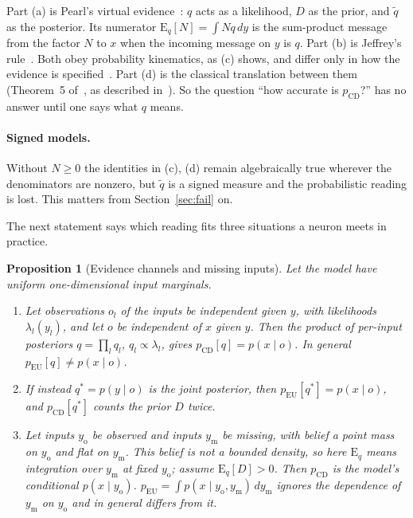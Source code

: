 \documentclass[10pt,a4paper]{article}
\newcommand{\pcd}{p_{\mathrm{CD}}}
\newcommand{\peu}{p_{\mathrm{EU}}}
\newcommand{\Eq}{\mathrm{E}_q}
\newcommand{\yo}{y_{\mathrm{o}}}
\newcommand{\ym}{y_{\mathrm{m}}}
\theoremstyle{upright}
\newtheorem{proposition}[theorem]{Proposition}
\begin{document}
Part (a) is Pearl's virtual evidence~\citep{pearl1988probabilistic}: $q$ acts as a likelihood, $D$ as the prior, and $\tilde q$ as the posterior. Its numerator $\Eq[N]=\int N q\,dy$ is the sum-product message~\citep{kschischang2001factor} from the factor $N$ to $x$ when the incoming message on $y$ is $q$. Part (b) is Jeffrey's rule~\citep{jeffrey1965logic,diaconis1982updating}. Both obey probability kinematics, as (c) shows, and differ only in how the evidence is specified~\citep{chan2003revision}. Part (d) is the classical translation between them (Theorem~5 of~\citep{chan2005revision}, as described in~\citep{peng2010uncertain}). So the question ``how accurate is $\pcd$?'' has no answer until one says what $q$ means.

\paragraph{Signed models.} Without $N\geq0$ the identities in (c), (d) remain algebraically true wherever the denominators are nonzero, but $\tilde q$ is a signed measure and the probabilistic reading is lost. This matters from Section~\ref{sec:fail} on.

The next statement says which reading fits three situations a neuron meets in practice.

\begin{proposition}[Evidence channels and missing inputs]\label{prop:chan}
Let the model have uniform one-dimensional input marginals.
\begin{enumerate}[label=(\alph*)]
\item Let observations $o_l$ of the inputs be independent given $y$, with likelihoods $\lambda_l(y_l)$, and let $o$ be independent of $x$ given $y$. Then the product of per-input posteriors $q=\prod_l q_l$, $q_l\propto\lambda_l$, gives $\pcd[q]=p(x\mid o)$. In general $\peu[q]\neq p(x\mid o)$.
\item If instead $q^\ast=p(y\mid o)$ is the joint posterior, then $\peu[q^\ast]=p(x\mid o)$, and $\pcd[q^\ast]$ counts the prior $D$ twice.
\item Let inputs $\yo$ be observed and inputs $\ym$ be missing, with belief a point mass on $\yo$ and flat on $\ym$. This belief is not a bounded density, so here $\Eq$ means integration over $\ym$ at fixed $\yo$; assume $\Eq[D]>0$. Then $\pcd$ is the model's conditional $p(x\mid \yo)$. $\peu=\int p(x\mid \yo,\ym)\,d\ym$ ignores the dependence of $\ym$ on $\yo$ and in general differs from it.
\end{enumerate}
\end{proposition}
\end{document}
